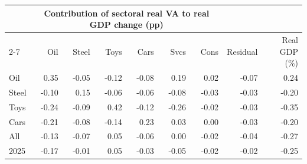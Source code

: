 \begin{tabular}{lrrrrrrrr}
\toprule
 & \multicolumn{6}{c}{Contribution of sectoral real VA to real GDP change (pp)} & & \\
\cmidrule(lr){2-7}
 & Oil & Steel & Toys & Cars & Svcs & Cons & Residual & Real GDP (\%) \\
\midrule
Oil & 0.35 & -0.05 & -0.12 & -0.08 & 0.19 & 0.02 & -0.07 & 0.24 \\
Steel & -0.10 & 0.15 & -0.06 & -0.06 & -0.08 & -0.03 & -0.03 & -0.20 \\
Toys & -0.24 & -0.09 & 0.42 & -0.12 & -0.26 & -0.02 & -0.03 & -0.35 \\
Cars & -0.21 & -0.08 & -0.14 & 0.23 & 0.03 & 0.00 & -0.03 & -0.20 \\
All & -0.13 & -0.07 & 0.05 & -0.06 & 0.00 & -0.02 & -0.04 & -0.27 \\
2025 & -0.17 & -0.01 & 0.05 & -0.03 & -0.05 & -0.02 & -0.02 & -0.25 \\
\bottomrule
\end{tabular}
